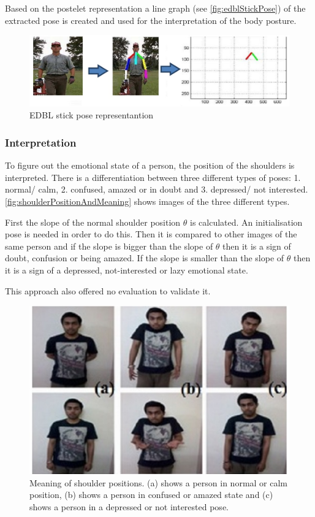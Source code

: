 \documentclass[conference]{IEEEtran}
\begin{document}
Based on the postelet representation a line graph (see \autoref{fig:edblStickPose}) of the extracted pose is created and used for the interpretation of the body posture. 

\begin{figure}[H]
\centering
\includegraphics[width=\linewidth]{edblStickPose.jpg}
\caption{EDBL stick pose representantion\cite{singh2015edbl}}
\label{fig:edblStickPose}
\end{figure}

\subsubsection{Interpretation}
To figure out the emotional state of a person, the position of the shoulders is interpreted. There is a differentiation between three different types of poses: 1. normal/ calm, 2. confused, amazed or in doubt and 3. depressed/ not interested. \autoref{fig:shoulderPositionAndMeaning} shows images of the three different types. 

First the slope of the normal shoulder position $\theta$ is calculated. An initialisation pose is needed in order to do this. Then it is compared to other images of the same person and if the slope is bigger than the slope of 	$\theta$ then it is a sign of doubt, confusion or being amazed. If the slope is smaller than the slope of $\theta$ then it is a sign of a depressed, not-interested or lazy emotional state.\

This approach also offered no evaluation to validate it. 
 
\begin{figure}[H]
\centering
\includegraphics[width=\linewidth]{shoulderPositionAndMeaning.jpg}
\caption{Meaning of shoulder positions. (a) shows a person in normal or calm position, (b) shows a person in confused or amazed state and (c) shows a person in a depressed or not interested pose.\cite{singh2015edbl}}
\label{fig:shoulderPositionAndMeaning}
\end{figure}
\end{document}
